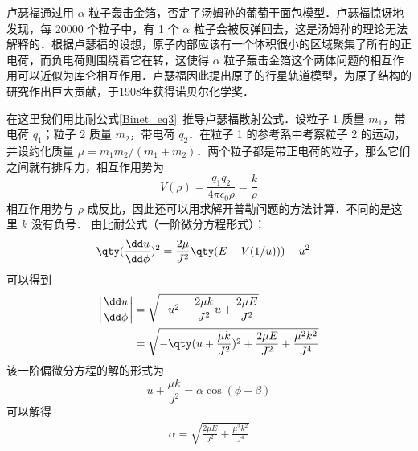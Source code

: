 
\begin{issues}
\issueDraft
\end{issues}


卢瑟福通过用 $\alpha$ 粒子轰击金箔，否定了汤姆孙的葡萄干面包模型．卢瑟福惊讶地发现，每 20000 个粒子中，有 1 个 $\alpha$ 粒子会被反弹回去，这是汤姆孙的理论无法解释的．根据卢瑟福的设想，原子内部应该有一个体积很小的区域聚集了所有的正电荷，而负电荷则围绕着它在转，这使得 $\alpha$ 粒子轰击金箔这个两体问题的相互作用可以近似为库仑相互作用．卢瑟福因此提出原子的行星轨道模型，为原子结构的研究作出巨大贡献，于1908年获得诺贝尔化学奖．

在这里我们用比耐公式\autoref{Binet_eq3}~推导卢瑟福散射公式．设粒子 1 质量 $m_1$，带电荷 $q_1$；粒子 2 质量 $m_2$，带电荷 $q_2$．在粒子 1 的参考系中考察粒子 2 的运动，并设约化质量 $\mu=m_1m_2/(m_1+m_2)$．两个粒子都是带正电荷的粒子，那么它们之间就有排斥力，相互作用势为
\begin{equation}
V(\rho)=\frac{q_1q_2}{4\pi\epsilon_0\rho}=\frac{k}{\rho}
\end{equation}
相互作用势与 $\rho$ 成反比，因此还可以用求解开普勒问题的方法计算．不同的是这里 $k$ 没有负号．
由比耐公式（一阶微分方程形式）：
\begin{equation}
\begin{aligned}
&\qty(\frac{\dd u}{\dd \phi})^2=\frac{2\mu}{J^2}\qty(E-V(1/u)))-u^2
\end{aligned}
\end{equation}
可以得到
\begin{equation}
\begin{aligned}
\left|\frac{\dd u}{\dd \phi}\right|&=\sqrt{-u^2-\frac{2\mu k}{J^2}u+\frac{2\mu E}{J^2}}\\
&=\sqrt{-\qty(u+\frac{\mu k}{J^2})^2+\frac{2\mu E}{J^2}+\frac{\mu^2 k^2}{J^4}}
\end{aligned}
\end{equation}
该一阶偏微分方程的解的形式为
\begin{equation}
u+\frac{\mu k}{J^2}=\alpha\cos(\phi-\beta)
\end{equation}
可以解得
\begin{equation}
\begin{aligned}
\alpha=\sqrt{\frac{2\mu E}{J^2}+\frac{\mu^2 k^2}{J^4}}\\
\end{aligned}
\end{equation}
